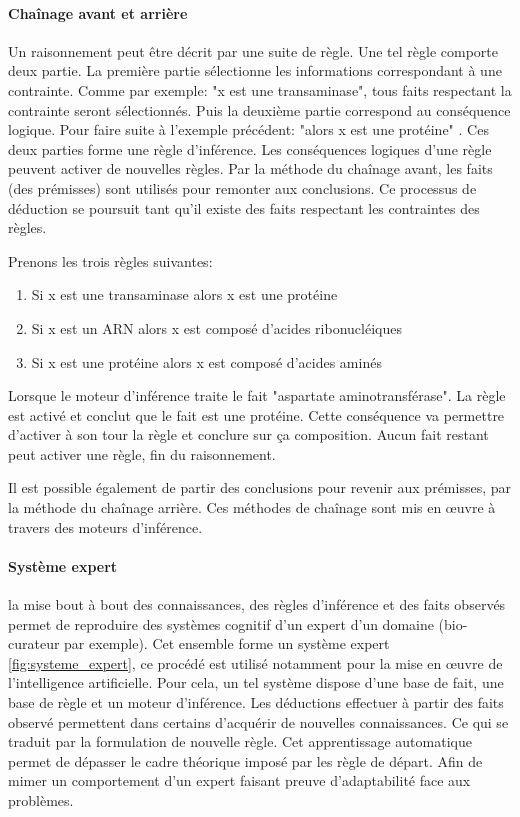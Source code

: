 \begin{refsegment}
    \paragraph{Chaînage avant et arrière} %
    Un raisonnement peut être décrit par une suite de règle. Une tel règle comporte deux partie. La première partie sélectionne les informations correspondant à une contrainte. Comme par exemple: "x est une transaminase", tous faits respectant la contrainte seront sélectionnés. Puis la deuxième partie correspond au conséquence logique. Pour faire suite à l'exemple précédent: "alors x est une protéine" . Ces deux parties forme une règle d'inférence. Les conséquences logiques d'une règle peuvent activer de nouvelles règles. Par la méthode du chaînage avant, les faits (des prémisses) sont utilisés pour remonter aux conclusions. Ce processus de déduction se poursuit tant qu'il existe des faits respectant les contraintes des règles.
    
    Prenons les trois règles suivantes:\nolisttopbreak    
    \begin{enumerate}
        \item Si x est une transaminase alors x est une protéine
        \item Si x est un ARN alors x est composé d'acides ribonucléiques
        \item Si x est une protéine alors x est composé d'acides aminés
    \end{enumerate}

    Lorsque le moteur d'inférence traite le fait "aspartate aminotransférase". La règle  est activé et  conclut que le fait est une protéine. Cette conséquence va permettre d'activer à son tour la règle  et conclure sur ça composition. Aucun fait restant peut activer une règle, fin du raisonnement.
    
    Il est possible également de partir des conclusions pour revenir aux prémisses, par la méthode du chaînage arrière. Ces méthodes de chaînage sont mis en œuvre à travers des moteurs d'inférence.
    
    \paragraph{Système expert} la mise bout à bout des connaissances, des règles d'inférence et des faits observés permet de reproduire des systèmes cognitif d'un expert d'un domaine (bio-curateur par exemple). Cet ensemble forme un système expert \ref{fig:systeme_expert}, ce procédé est utilisé notamment pour la mise en œuvre de l'intelligence artificielle. Pour cela, un tel système dispose d'une base de fait, une base de règle et un moteur d'inférence. Les déductions effectuer à partir des faits observé permettent dans certains d'acquérir de nouvelles connaissances. Ce qui se traduit par la formulation de nouvelle règle. Cet apprentissage automatique permet de dépasser le cadre théorique imposé par les règle de départ. Afin de mimer un comportement d'un expert faisant preuve d'adaptabilité face aux problèmes.
    

\end{refsegment}
